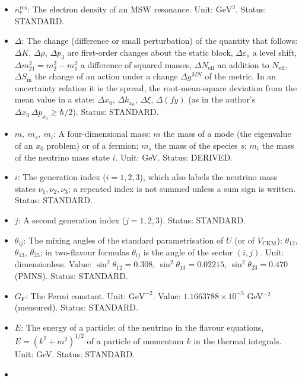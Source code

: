 \documentclass[
  10pt,
]{article}
\providecommand{\tightlist}{%
  \setlength{\itemsep}{0pt}\setlength{\parskip}{0pt}}
\begin{document}
\begin{itemize}
\tightlist
\item
  \(n_{\mathrm{e}}^{\mathrm{res}}\): The electron density of an MSW
  resonance. Unit: \(\mathrm{GeV}^{3}\). Status: STANDARD.
\item
  \(\Delta\): The change (difference or small perturbation) of the
  quantity that follows: \(\Delta K\), \(\Delta\rho\), \(\Delta p_3\)
  are first-order changes about the static block,
  \(\Delta\varepsilon_o\) a level shift,
  \(\Delta m^2_{21} = m_2^2 - m_1^2\) a difference of squared masses,
  \(\Delta N_{\mathrm{eff}}\) an addition to \(N_{\mathrm{eff}}\),
  \(\Delta S_{\mathrm{m}}\) the change of an action under a change
  \(\Delta g^{MN}\) of the metric. In an uncertainty relation it is the
  spread, the root-mean-square deviation from the mean value in a state:
  \(\Delta x_0\), \(\Delta k_{x_0}\), \(\Delta\xi\), \(\Delta(fy)\) (as
  in the author's \(\Delta x_0\,\Delta p_{x_0} \ge \hbar/2\)). Status:
  STANDARD.
\item
  \(m,\ m_s,\ m_i\): A four-dimensional mass: \(m\) the mass of a mode
  (the eigenvalue of an \(x_0\) problem) or of a fermion; \(m_s\) the
  mass of the species \(s\); \(m_i\) the mass of the neutrino mass state
  \(i\). Unit: GeV. Status: DERIVED.
\item
  \(i\): The generation index (\(i = 1, 2, 3\)), which also labels the
  neutrino mass states \(\nu_1, \nu_2, \nu_3\); a repeated index is not
  summed unless a sum sign is written. Status: STANDARD.
\item
  \(j\): A second generation index (\(j = 1, 2, 3\)). Status: STANDARD.
\item
  \(\theta_{ij}\): The mixing angles of the standard parametrisation of
  \(U\) (or of \(V_{\mathrm{CKM}}\)): \(\theta_{12}\), \(\theta_{13}\),
  \(\theta_{23}\); in two-flavour formulas \(\theta_{ij}\) is the angle
  of the sector \((i, j)\). Unit: dimensionless. Value:
  \(\sin^2\theta_{12} = 0.308\), \(\sin^2\theta_{13} = 0.02215\),
  \(\sin^2\theta_{23} = 0.470\) (PMNS). Status: STANDARD.
\item
  \(G_{\mathrm{F}}\): The Fermi constant. Unit: \(\mathrm{GeV}^{-2}\).
  Value: \(1.1663788\times10^{-5}\) GeV\(^{-2}\) (measured). Status:
  STANDARD.
\item
  \(E\): The energy of a particle: of the neutrino in the flavour
  equations, \(E = (k^2 + m^2)^{1/2}\) of a particle of momentum \(k\)
  in the thermal integrals. Unit: GeV. Status: STANDARD.
\item

\end{itemize}
\end{document}
